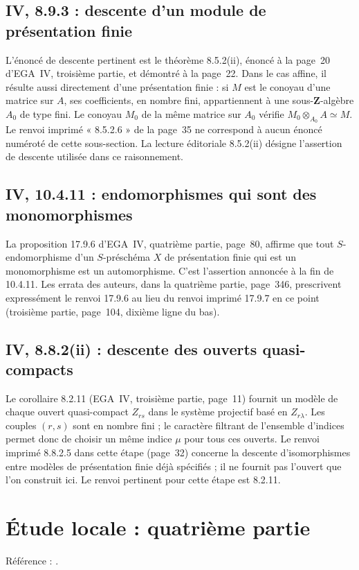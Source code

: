 \documentclass[11pt,a4paper]{article}
\begin{document}
\subsection{IV, 8.9.3 : descente d'un module de présentation finie}
L'énoncé de descente pertinent est le théorème 8.5.2(ii), énoncé à la
page~20 d'EGA~IV, troisième partie, et démontré à la page~22. Dans le
cas affine, il résulte aussi directement d'une présentation finie :
si $M$ est le conoyau d'une matrice sur $A$, ses coefficients, en
nombre fini, appartiennent à une sous-$\mathbf Z$-algèbre $A_0$ de
type fini. Le conoyau $M_0$ de la même matrice sur $A_0$ vérifie
$M_0\otimes_{A_0}A\simeq M$.
Le renvoi imprimé « 8.5.2.6 » de la page~35 ne correspond à aucun
énoncé numéroté de cette sous-section. La lecture éditoriale 8.5.2(ii)
désigne l'assertion de descente utilisée dans ce raisonnement.

\subsection{IV, 10.4.11 : endomorphismes qui sont des monomorphismes}
La proposition 17.9.6 d'EGA~IV, quatrième partie, page~80, affirme
que tout $S$-endomorphisme d'un $S$-préschéma $X$ de présentation
finie qui est un monomorphisme est un automorphisme. C'est l'assertion
annoncée à la fin de 10.4.11. Les errata des auteurs, dans la quatrième
partie, page~346, prescrivent expressément le renvoi 17.9.6 au lieu
du renvoi imprimé 17.9.7 en ce point (troisième partie, page~104,
dixième ligne du bas).

\subsection{IV, 8.8.2(ii) : descente des ouverts quasi-compacts}
Le corollaire 8.2.11 (EGA~IV, troisième partie, page~11) fournit
un modèle de chaque ouvert quasi-compact $Z_{rs}$ dans le système
projectif basé en $Z_{r\lambda}$. Les couples $(r,s)$ sont en nombre
fini ; le caractère filtrant de l'ensemble d'indices permet donc
de choisir un même indice $\mu$ pour tous ces ouverts.
Le renvoi imprimé 8.8.2.5 dans cette étape (page~32) concerne la
descente d'isomorphismes entre modèles de présentation finie déjà
spécifiés ; il ne fournit pas l'ouvert que l'on construit ici.
Le renvoi pertinent pour cette étape est 8.2.11.

\section{Étude locale : quatrième partie}
\label{part:iv4}
Référence : \cite{EGAIV4}.
\end{document}
